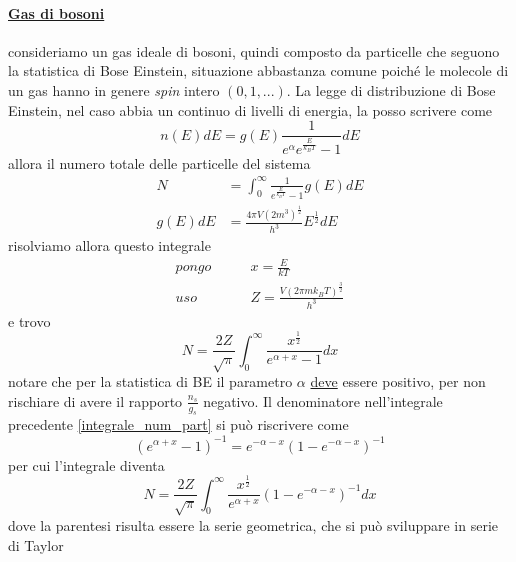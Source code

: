 \paragraph{\underline{Gas di bosoni}} consideriamo un gas ideale di bosoni, quindi composto da particelle che seguono la statistica di Bose Einstein, situazione abbastanza comune poiché le molecole di un gas hanno in genere \textit{spin} intero $(0, 1, ...)$.
La legge di distribuzione di Bose Einstein, nel caso abbia un continuo di livelli di energia, la posso scrivere come
\begin{equation}
n(E)dE = g(E) \frac{1}{e^{ \alpha } e^{ \frac{E}{k_B T} } - 1 } dE
\end{equation}
allora il numero totale delle particelle del sistema
\begin{equation}
\begin{split}
N & = \int_0^{\infty} \frac{1}{e^{ \frac{E}{k_B T} } - 1} g(E) dE \\
g(E)dE & = \frac{4\pi V (2m^3)^{ \frac{1}{2} }}{h^3} E^{\frac{1}{2} } dE
\end{split}
\end{equation}
risolviamo allora questo integrale
\begin{equation}
\begin{split}
pongo & \quad\quad x = \frac{E}{kT} \\
uso & \quad\quad Z = \frac{V (2 \pi m k_B T)^{ \frac{3}{2} } }{h^3}
\end{split}
\end{equation}
e trovo
\begin{equation}
N = \frac{2Z}{\sqrt{\pi}} \int_0^{\infty} \frac{x^{ \frac{1}{2} }}{e^{ \alpha + x } - 1} dx
\label{integrale_num_part}
\end{equation}
notare che per la statistica di BE il parametro $\alpha$ \underline{deve} essere positivo, per non rischiare di avere il rapporto $\frac{n_s}{g_s}$ negativo.
Il denominatore nell'integrale precedente \ref{integrale_num_part} si può riscrivere come
\begin{equation}
(e^{ \alpha + x } - 1)^{-1} = e^{ - \alpha - x } (1 - e^{ - \alpha - x })^{ -1 }
\end{equation}
per cui l'integrale diventa
\begin{equation}
N = \frac{2Z}{\sqrt{\pi}} \int_0^{\infty} \frac{x^{ \frac{1}{2} }}{e^{ \alpha + x }} (1 - e^{ - \alpha - x })^{ -1 } dx
\end{equation}
dove la parentesi risulta essere la serie geometrica, che si può sviluppare in serie di Taylor
